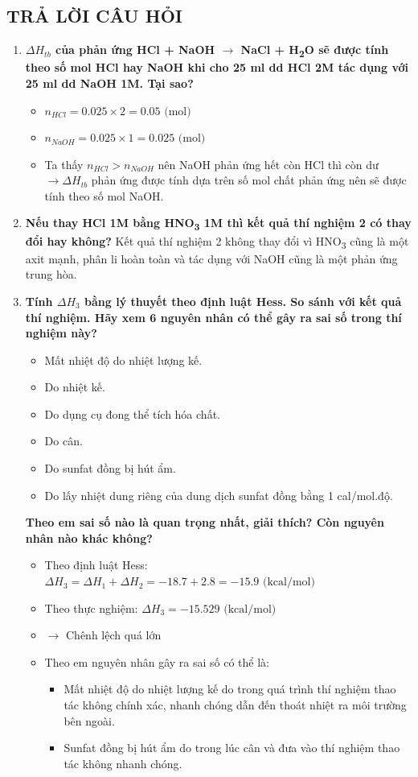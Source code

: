 \subsection{TRẢ LỜI CÂU HỎI}
\begin{enumerate}
    \item \textbf{$\Delta H_{tb}$ của phản ứng HCl + NaOH $\rightarrow$ NaCl + H\textsubscript{2}O sẽ được tính theo số mol HCl hay NaOH khi cho 25 ml dd HCl 2M tác dụng với 25 ml dd NaOH 1M. Tại sao?}
    \begin{itemize}
        \item $n_{HCl} = 0.025 \times 2 = 0.05 \text{ (mol)}$
        \item $n_{NaOH} = 0.025 \times 1 = 0.025 \text{ (mol)}$
        \item Ta thấy $n_{HCl} > n_{NaOH}$ nên NaOH phản ứng hết còn HCl thì còn dư $\rightarrow \Delta H_{tb}$ phản ứng được tính dựa trên số mol chất phản ứng nên sẽ được tính theo số mol NaOH.
    \end{itemize}
    \item \textbf{Nếu thay HCl 1M bằng HNO\textsubscript{3} 1M thì kết quả thí nghiệm 2 có thay đổi hay không?}
    Kết quả thí nghiệm 2 không thay đổi vì HNO\textsubscript{3} cũng là một axit mạnh, phân li hoàn toàn và tác dụng với NaOH cũng là một phản ứng trung hòa.
    \item \textbf{Tính $\Delta H_3$ bằng lý thuyết theo định luật Hess. So sánh với kết quả thí nghiệm. Hãy xem 6 nguyên nhân có thể gây ra sai số trong thí nghiệm này?}
    \begin{itemize}
        \item Mất nhiệt độ do nhiệt lượng kế.
        \item Do nhiệt kế.
        \item Do dụng cụ đong thể tích hóa chất.
        \item Do cân.
        \item Do sunfat đồng bị hút ẩm.
        \item Do lấy nhiệt dung riêng của dung dịch sunfat đồng bằng 1 cal/mol.độ.
    \end{itemize}
    \textbf{Theo em sai số nào là quan trọng nhất, giải thích? Còn nguyên nhân nào khác không?}
    \begin{itemize}
        \item Theo định luật Hess: $\Delta H_3 = \Delta H_1 + \Delta H_2 = -18.7 + 2.8 = -15.9 \text{ (kcal/mol)}$
        \item Theo thực nghiệm: $\Delta H_3 = -15.529 \text{ (kcal/mol)}$
        \item $\rightarrow$ Chênh lệch quá lớn
        \item Theo em nguyên nhân gây ra sai số có thể là:
        \begin{itemize}
            \item Mất nhiệt độ do nhiệt lượng kế do trong quá trình thí nghiệm thao tác không chính xác, nhanh chóng dẫn đến thoát nhiệt ra môi trường bên ngoài.
            \item Sunfat đồng bị hút ẩm do trong lúc cân và đưa vào thí nghiệm thao tác không nhanh chóng.
        \end{itemize}
    \end{itemize}
\end{enumerate}
